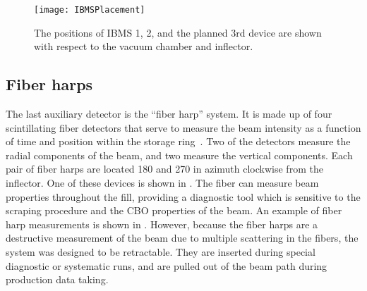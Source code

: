 \begin{figure}
    \centering
    \texttt{[image: IBMSPlacement]}
    \caption[IBMS positions]{The positions of IBMS 1, 2, and the planned 3rd device are shown with respect to the vacuum chamber and inflector.}   
    \label{fig:IBMSPlacement}
\end{figure}



\subsection{Fiber harps}
\label{sec:FiberHarps}

The last auxiliary detector is the ``fiber harp'' system. It is made up of four scintillating fiber detectors that serve to measure the beam intensity as a function of time and position within the storage ring~\cite{fiberharp}. Two of the detectors measure the radial components of the beam, and two measure the vertical components. Each pair of fiber harps are located 180\textdegree{} and 270\textdegree{} in azimuth clockwise from the inflector. One of these devices is shown in . The fiber can measure beam properties throughout the fill, providing a diagnostic tool which is sensitive to the scraping procedure and the CBO properties of the beam. An example of fiber harp measurements is shown in . However, because the fiber harps are a destructive measurement of the beam due to multiple scattering in the fibers, the system was designed to be retractable. They are inserted during special diagnostic or systematic runs, and are pulled out of the beam path during production data taking.





